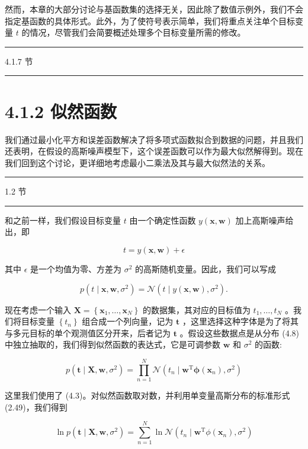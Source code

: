 \documentclass[10pt]{report}
\newcommand{\HRule}{\begin{center}\rule{0.9\linewidth}{0.2mm}\end{center}}
\begin{document}
然而，本章的大部分讨论与基函数集的选择无关，因此除了数值示例外，我们不会指定基函数的具体形式。此外，为了使符号表示简单，我们将重点关注单个目标变量 \(t\) 的情况，尽管我们会简要概述处理多个目标变量所需的修改。

\HRule

4.1.7 节

\HRule

\section*{4.1.2 似然函数}

我们通过最小化平方和误差函数解决了将多项式函数拟合到数据的问题，并且我们还表明，在假设的高斯噪声模型下，这个误差函数可以作为最大似然解得到。现在我们回到这个讨论，更详细地考虑最小二乘法及其与最大似然法的关系。

\HRule

1.2 节

\HRule

和之前一样，我们假设目标变量 \(t\) 由一个确定性函数 \(y\left( {\mathbf{x},\mathbf{w}}\right)\) 加上高斯噪声给出，即

\[
t = y\left( {\mathbf{x},\mathbf{w}}\right)  + \epsilon  \tag{4.7}
\]

其中 \(\epsilon\) 是一个均值为零、方差为 \({\sigma }^{2}\) 的高斯随机变量。因此，我们可以写成

\[
p\left( {t \mid  \mathbf{x},\mathbf{w},{\sigma }^{2}}\right)  = \mathcal{N}\left( {t \mid  y\left( {\mathbf{x},\mathbf{w}}\right) ,{\sigma }^{2}}\right) . \tag{4.8}
\]

现在考虑一个输入 \(\mathbf{X} = \left\{  {{\mathbf{x}}_{1},\ldots ,{\mathbf{x}}_{N}}\right\}\) 的数据集，其对应的目标值为 \({t}_{1},\ldots ,{t}_{N}\) 。我们将目标变量 \(\left\{  {t}_{n}\right\}\) 组合成一个列向量，记为 \(\mathbf{t}\) ，这里选择这种字体是为了将其与多元目标的单个观测值区分开来，后者记为 \(\mathbf{t}\) 。假设这些数据点是从分布 (4.8) 中独立抽取的，我们得到似然函数的表达式，它是可调参数 \(\mathbf{w}\) 和 \({\sigma }^{2}\) 的函数:

\[
p\left( {\mathbf{t} \mid  \mathbf{X},\mathbf{w},{\sigma }^{2}}\right)  = \mathop{\prod }\limits_{{n = 1}}^{N}\mathcal{N}\left( {{t}_{n} \mid  {\mathbf{w}}^{\mathrm{T}}\mathbf{\phi }\left( {\mathbf{x}}_{n}\right) ,{\sigma }^{2}}\right)  \tag{4.9}
\]

这里我们使用了 (4.3)。对似然函数取对数，并利用单变量高斯分布的标准形式 (2.49)，我们得到

\[
\ln p\left( {\mathbf{t} \mid  \mathbf{X},\mathbf{w},{\sigma }^{2}}\right)  = \mathop{\sum }\limits_{{n = 1}}^{N}\ln \mathcal{N}\left( {{t}_{n} \mid  {\mathbf{w}}^{\mathrm{T}}\phi \left( {\mathbf{x}}_{n}\right) ,{\sigma }^{2}}\right)
\]
\end{document}
